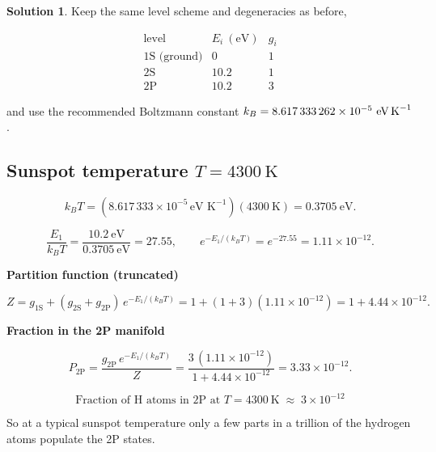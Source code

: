 \documentclass[12pt]{article}
\theoremstyle{definition} %
\newtheorem{solution}{Solution}
\theoremstyle{plain} %
\begin{document}
              \begin{solution}
                Keep the same level scheme and degeneracies as before,
                
                \[
                \begin{array}{c|c|c}
                \text{level} & E_i\ (\text{eV}) & g_i \\ \hline
                \text{1S (ground)} & 0      & 1 \\
                \text{2S}          & 10.2   & 1 \\
                \text{2P}          & 10.2   & 3
                \end{array}
                \]
                
                and use the recommended Boltzmann constant  
                \(k_B = 8.617\,333\,262\times10^{-5}\ \text{eV\,K}^{-1}\).
                
                \subsection*{Sunspot temperature \(T = 4300\ \text{K}\)}
                
                \[
                k_B T = (8.617\,333\times10^{-5}\,\text{eV K}^{-1})(4300\ \text{K})
                       = 0.3705\ \text{eV}.
                \]
                
                \[
                \frac{E_1}{k_B T} = \frac{10.2\ \text{eV}}{0.3705\ \text{eV}} = 27.55,
                \qquad
                e^{-E_1/(k_B T)} = e^{-27.55} = 1.11\times10^{-12}.
                \]
                
                \medskip
                \textbf{Partition function (truncated)}
                
                \[
                Z = g_{1\text{S}}
                    + (g_{2\text{S}}+g_{2\text{P}})\,e^{-E_1/(k_B T)}
                  = 1 + (1+3)(1.11\times10^{-12})
                  = 1 + 4.44\times10^{-12}.
                \]
                
                \medskip
                \textbf{Fraction in the 2P manifold}
                
                \[
                P_{2\text{P}}
                  = \frac{g_{2\text{P}}\,e^{-E_1/(k_B T)}}{Z}
                  = \frac{3\,(1.11\times10^{-12})}{1 + 4.44\times10^{-12}}
                  = 3.33\times10^{-12}.
                \]
                
                \[
                \boxed{\;
                \text{Fraction of H atoms in 2P at }T = 4300\ \text{K}
                      \;\approx\; 3\times10^{-12}
                \;}
                \]
                
                So at a typical sunspot temperature only a few parts in a trillion of
                the hydrogen atoms populate the 2P states.
                \end{solution}
\end{document}
